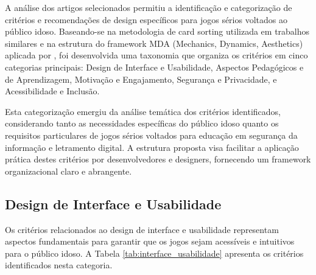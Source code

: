 A análise dos artigos selecionados permitiu a identificação e categorização de critérios e recomendações de design específicos para jogos sérios voltados ao público idoso. Baseando-se na metodologia de card sorting utilizada em trabalhos similares \cite{pillon2022proposicao} e na estrutura do framework MDA (Mechanics, Dynamics, Aesthetics) aplicada por \cite{belarmino2021criterios}, foi desenvolvida uma taxonomia que organiza os critérios em cinco categorias principais: Design de Interface e Usabilidade, Aspectos Pedagógicos e de Aprendizagem, Motivação e Engajamento, Segurança e Privacidade, e Acessibilidade e Inclusão.

Esta categorização emergiu da análise temática dos critérios identificados, considerando tanto as necessidades específicas do público idoso quanto os requisitos particulares de jogos sérios voltados para educação em segurança da informação e letramento digital. A estrutura proposta visa facilitar a aplicação prática destes critérios por desenvolvedores e designers, fornecendo um framework organizacional claro e abrangente.

\subsection{Design de Interface e Usabilidade}
\label{subsec:interface_usabilidade}

Os critérios relacionados ao design de interface e usabilidade representam aspectos fundamentais para garantir que os jogos sejam acessíveis e intuitivos para o público idoso. A Tabela \ref{tab:interface_usabilidade} apresenta os critérios identificados nesta categoria.

